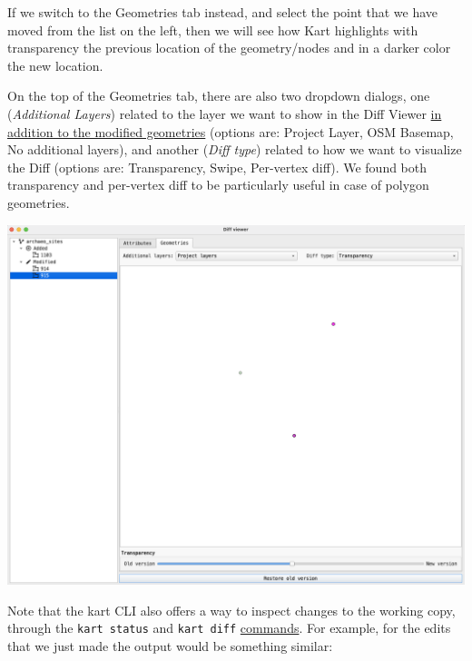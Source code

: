 \documentclass[
  letterpaper,
  DIV=11,
  numbers=noendperiod]{scrartcl}
\begin{document}
If we switch to the Geometries tab instead, and select the point that we
have moved from the list on the left, then we will see how Kart
highlights with transparency the previous location of the geometry/nodes
and in a darker color the new location.

On the top of the Geometries tab, there are also two dropdown dialogs,
one (\emph{Additional Layers}) related to the layer we want to show in
the Diff Viewer \ul{in addition to the modified geometries} (options
are: Project Layer, OSM Basemap, No additional layers), and another
(\emph{Diff type}) related to how we want to visualize the Diff (options
are: Transparency, Swipe, Per-vertex diff). We found both transparency
and per-vertex diff to be particularly useful in case of polygon
geometries.

\begin{center}
\includegraphics{img/kart-diff-geometry.png}
\end{center}

Note that the kart CLI also offers a way to inspect changes to the
working copy, through the \texttt{kart\ status} and \texttt{kart\ diff}
\href{https://docs.kartproject.org/en/latest/pages/basic_usage_tutorial.html\#making-and-committing-changes}{commands}.
For example, for the edits that we just made the output would be
something similar:
\end{document}
